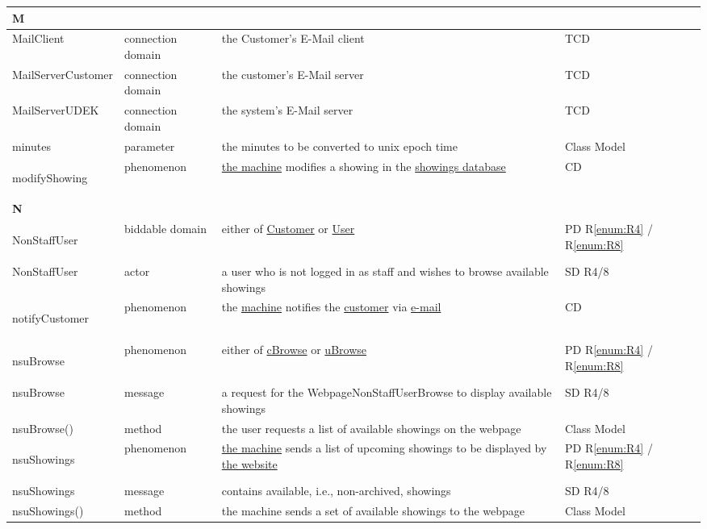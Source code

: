 \documentclass[a4paper,10pt,titlepage,bibtotoc,bibtotocnumbered]{scrreprt}
\begin{document}
\begin{longtable}{|p{4cm}|p{3cm}|p{5cm}|l|}
\hline
\multicolumn{4}{|l|}{\textbf{M}}\\
\hline
MailClient & connection domain & the Customer's E-Mail client & TCD\\
\hline
MailServerCustomer & connection domain & the customer's E-Mail server & TCD\\
\hline
MailServerUDEK & connection domain & the system's E-Mail server & TCD\\
\hline
minutes & parameter & the minutes to be converted to unix epoch time & Class Model\\
\hline
\hypertarget{glossary:modifyShowing}{modifyShowing} & phenomenon & \hyperlink{glossary:UDEKino}{the machine} modifies a showing in the \hyperlink{glossary:Showing}{showings database} & CD\\
\hline
\multicolumn{4}{|l|}{\textbf{N}}\\
\hline
\hypertarget{glossary:NonStaffUser}{NonStaffUser} & biddable domain & either of \hyperlink{glossary:Customer}{Customer} or \hyperlink{glossary:User}{User} & PD R\ref{enum:R4} / R\ref{enum:R8}\\
\hline
NonStaffUser & actor & a user who is not logged in as staff and wishes to browse available showings & SD R4/8\\
\hline
\hypertarget{glossary:notifyCustomer}{notifyCustomer} & phenomenon & the \hyperlink{glossary:UDEKino}{machine} notifies the \hyperlink{glossary:Customer}{customer} via \hyperlink{glossary:Email}{e-mail} & CD\\
\hline
\hypertarget{glossary:nsuBrowse}{nsuBrowse} & phenomenon & either of \hyperlink{glossary:cBrowse}{cBrowse} or \hyperlink{glossary:uBrowse}{uBrowse} & PD R\ref{enum:R4} / R\ref{enum:R8}\\
\hline
nsuBrowse & message & a request for the WebpageNonStaffUserBrowse to display available showings & SD R4/8\\
\hline
nsuBrowse() & method & the user requests a list of available showings on the webpage & Class Model\\
\hline
\hypertarget{glossary:nsuShowings}{nsuShowings} & phenomenon & \hyperlink{glossary:UDEK-NonStaffUserBrowse}{the machine} sends a list of upcoming showings to be displayed by \hyperlink{glossary:WebPageNonStaffUserBrowse}{the website} & PD R\ref{enum:R4} / R\ref{enum:R8}\\
\hline
nsuShowings & message & contains available, i.e., non-archived, showings & SD R4/8\\
\hline
nsuShowings() & method & the machine sends a set of available showings to the webpage & Class Model\\

\end{longtable}
\end{document}
